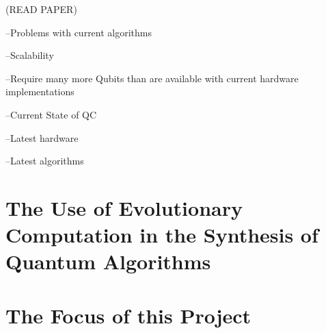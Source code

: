 \documentclass[authoryearcitations]{UoYCSproject}
\begin{document}
(READ PAPER)

--Problems with current algorithms

	--Scalability
	
	--Require many more Qubits than are available with current hardware implementations


--Current State of QC
	
	--Latest hardware
	
	--Latest algorithms

\section{The Use of Evolutionary Computation in the Synthesis of Quantum Algorithms}

\section{The Focus of this Project}


\end{document}
